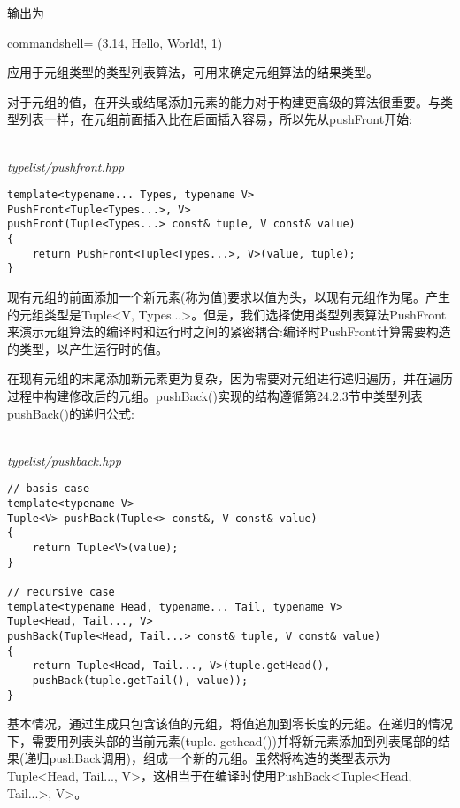 输出为

\begin{tcblisting}{commandshell={}}
(3.14, Hello, World!, 1)
\end{tcblisting}

应用于元组类型的类型列表算法，可用来确定元组算法的结果类型。


对于元组的值，在开头或结尾添加元素的能力对于构建更高级的算法很重要。与类型列表一样，在元组前面插入比在后面插入容易，所以先从pushFront开始:

\hspace*{\fill} \\ %
\noindent
\textit{typelist/pushfront.hpp}
\begin{lstlisting}[style=styleCXX]
template<typename... Types, typename V>
PushFront<Tuple<Types...>, V>
pushFront(Tuple<Types...> const& tuple, V const& value)
{
	return PushFront<Tuple<Types...>, V>(value, tuple);
}
\end{lstlisting}

现有元组的前面添加一个新元素(称为值)要求以值为头，以现有元组作为尾。产生的元组类型是Tuple<V, Types...>。但是，我们选择使用类型列表算法PushFront来演示元组算法的编译时和运行时之间的紧密耦合:编译时PushFront计算需要构造的类型，以产生运行时的值。

在现有元组的末尾添加新元素更为复杂，因为需要对元组进行递归遍历，并在遍历过程中构建修改后的元组。pushBack()实现的结构遵循第24.2.3节中类型列表pushBack()的递归公式:

\hspace*{\fill} \\ %
\noindent
\textit{typelist/pushback.hpp}
\begin{lstlisting}[style=styleCXX]
// basis case
template<typename V>
Tuple<V> pushBack(Tuple<> const&, V const& value)
{
	return Tuple<V>(value);
}

// recursive case
template<typename Head, typename... Tail, typename V>
Tuple<Head, Tail..., V>
pushBack(Tuple<Head, Tail...> const& tuple, V const& value)
{
	return Tuple<Head, Tail..., V>(tuple.getHead(),
	pushBack(tuple.getTail(), value));
}
\end{lstlisting}

基本情况，通过生成只包含该值的元组，将值追加到零长度的元组。在递归的情况下，需要用列表头部的当前元素(tuple. gethead())并将新元素添加到列表尾部的结果(递归pushBack调用)，组成一个新的元组。虽然将构造的类型表示为Tuple<Head, Tail..., V>，这相当于在编译时使用PushBack<Tuple<Head, Tail...>, V>。

